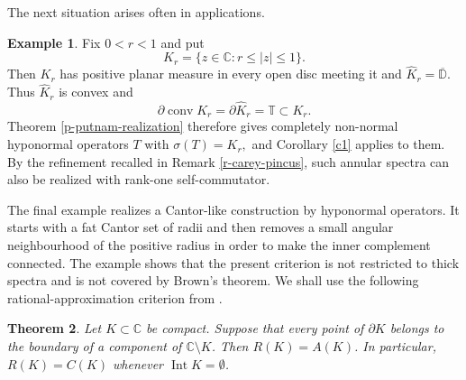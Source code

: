\documentclass[11pt]{amsart}
\numberwithin{equation}{section}
\newtheorem{theorem}{Theorem}[section]
\theoremstyle{definition}
\newtheorem{example}[theorem]{Example}
\theoremstyle{remark}
\DeclareMathOperator{\conv}{conv}
\newcommand{\CC}{\mathbb{C}}
\begin{document}
The next situation arises often in applications.

\begin{example}
\label{ex-annular-hyponormal}
Fix $0<r<1$ and put
\[
    K_r=\{z\in\mathbb C:r\le |z|\le1\}.
\]
Then $K_r$ has positive planar measure in every open disc meeting it and
\(
    \widehat K_r=\overline{\mathbb D}.
\)
Thus $\widehat K_r$ is convex and
\[
    \partial\conv K_r=\partial\widehat K_r=\mathbb T\subset K_r.
\]
Theorem \ref{p-putnam-realization} therefore gives completely non-normal
hyponormal operators $T$ with
\(
    \sigma(T)=K_r,
\)
and Corollary \ref{c1} applies to them. By the refinement recalled in Remark \ref{r-carey-pincus}, such annular spectra can also be realized with rank-one self-commutator.
\end{example}

The final example realizes a Cantor-like construction by hyponormal
operators. It starts with a fat Cantor set of radii and then removes a small
angular neighbourhood of the positive radius in order to make the inner
complement connected. The example shows that the present criterion is not
restricted to thick spectra and is not covered by Brown's theorem. We shall use
the following rational-approximation criterion from \cite[Ch.~VIII,
Corollary~8.4]{Gam}.
\begin{theorem}\label{thm:rational-criterion}
Let \(K\subset\CC\) be compact. Suppose that every point of \(\partial K\) belongs to the boundary of a component of \(\CC\setminus K\). Then \(R(K)=A(K)\).
In particular, $R(K)=C(K)$ whenever $\operatorname{Int}K=\emptyset$.
\end{theorem}
\end{document}
